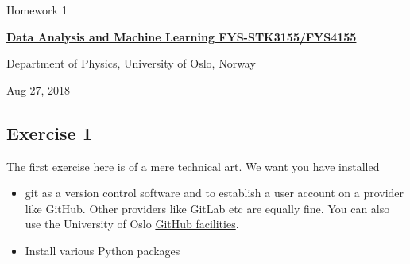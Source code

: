 \documentclass[%
oneside,                 %
final,                   %
10pt]{article}
\begin{document}

\newcommand{\exercisesection}[1]{\subsection*{#1}}






\thispagestyle{empty}

\begin{center}
{\LARGE\bf
\begin{spacing}{1.25}
Homework 1
\end{spacing}
}
\end{center}


\begin{center}
{\bf \href{{http://www.uio.no/studier/emner/matnat/fys/FYS3155/index-eng.html}}{Data Analysis and Machine Learning FYS-STK3155/FYS4155}}
\end{center}

    \begin{center}
\centerline{{\small Department of Physics, University of Oslo, Norway}}
\end{center}
    

\begin{center}
Aug 27, 2018
\end{center}

\vspace{1cm}


\subsection{Exercise 1}

The first exercise here is of a mere technical art. We want you have installed 
\begin{itemize}
\item git as a version control software and to establish a user account on a provider like GitHub. Other providers like GitLab etc are equally fine. You can also use the University of Oslo \href{{https://www.uio.no/tjenester/it/maskin/filer/versjonskontroll/github.html}}{GitHub facilities}. 

\item Install various Python packages
\end{itemize}
\end{document}
